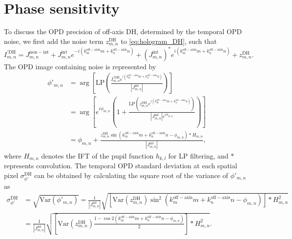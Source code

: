 \section{Phase sensitivity}

To discuss the OPD precision of off-axis DH, determined by the temporal OPD noise, we first add the noise term $z_{m,n}^{\mathrm{DH}}$ to \eqref{eq:hologram_DH}, such that
\begin{equation}
I_{m,n}^{'\mathrm{DH}} = J_{m,n}^{\mathrm{non-int}} + J_{m,n}^{\mathrm{int}} e^{-i(k_m^{\mathrm{off-axis}}m + k_n^{\mathrm{off-axis}}n)} + (J_{m,n}^{\mathrm{int}})^* e^{i(k_m^{\mathrm{off-axis}}m + k_n^{\mathrm{off-axis}}n)} + z_{m,n}^{\mathrm{DH}}.
\end{equation}
The OPD image containing noise is represented by
\begin{align}
\phi'_{m,n} &= \arg\left[\mathrm{LP}\left(\frac{I_{m,n}^{'\mathrm{DH}} e^{i(k_m^{\mathrm{off-axis}}m + k_n^{\mathrm{off-axis}}n)}}{|J_{m,n}^{\mathrm{int}}|}\right)\right] \nonumber \\
&= \arg\left[e^{i\phi_{m,n}}\left(1 + \frac{\mathrm{LP}(z_{m,n}^{\mathrm{DH}} e^{i(k_m^{\mathrm{off-axis}}m + k_n^{\mathrm{off-axis}}n)})}{|J_{m,n}^{\mathrm{int}}| e^{i\phi_{m,n}}}\right)\right] \nonumber \\
&= \phi_{m,n} + \frac{z_{m,n}^{\mathrm{DH}} \sin(k_m^{\mathrm{off-axis}}m + k_n^{\mathrm{off-axis}}n - \phi_{m,n}) \ast H_{m,n}}{|J_{m,n}^{\mathrm{int}}|},
\end{align}
where $H_{m,n}$ denotes the IFT of the pupil function $h_{k,l}$ for LP filtering, and $\ast$ represents convolution. The temporal OPD standard deviation at each spatial pixel $\sigma_{\phi'}^{\mathrm{DH}}$ can be obtained by calculating the square root of the variance of $\phi'_{m,n}$ as
\begin{align}
\sigma_{\phi'}^{\mathrm{DH}} &= \sqrt{\mathrm{Var}(\phi'_{m,n})} = \frac{1}{|J_{m,n}^{\mathrm{int}}|} \sqrt{[\mathrm{Var}(z_{m,n}^{\mathrm{DH}}) \sin^2(k_m^{\mathrm{off-axis}}m + k_n^{\mathrm{off-axis}}n - \phi_{m,n})] \ast H_{m,n}^2} \nonumber \\
&= \frac{1}{|J_{m,n}^{\mathrm{int}}|} \sqrt{\left[\mathrm{Var}(z_{m,n}^{\mathrm{DH}}) \frac{1 - \cos 2(k_m^{\mathrm{off-axis}}m + k_n^{\mathrm{off-axis}}n - \phi_{m,n})}{2}\right] \ast H_{m,n}^2}. \label{eq:sigma_phi_DH}
\end{align}

